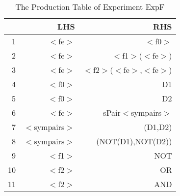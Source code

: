 \begin{table}[ht]
\centering
\begin{tabular}{rrr}
  \hline
 & LHS & RHS \\ 
  \hline
1 & $<$fe$>$ & $<$f0$>$ \\ 
  2 & $<$fe$>$ & $<$f1$>$($<$fe$>$) \\ 
  3 & $<$fe$>$ & $<$f2$>$($<$fe$>$,$<$fe$>$) \\ 
  4 & $<$f0$>$ & D1 \\ 
  5 & $<$f0$>$ & D2 \\ 
  6 & $<$fe$>$ & sPair$<$sympairs$>$ \\ 
  7 & $<$sympairs$>$ & (D1,D2) \\ 
  8 & $<$sympairs$>$ & (NOT(D1),NOT(D2)) \\ 
  9 & $<$f1$>$ & NOT \\ 
  10 & $<$f2$>$ & OR \\ 
  11 & $<$f2$>$ & AND \\ 
   \hline
\end{tabular}
\caption{The Production Table of Experiment ExpF} 
\end{table}
